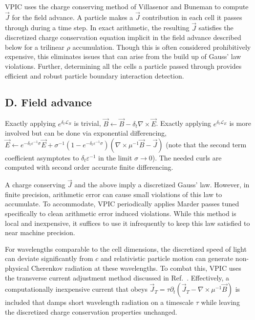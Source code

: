 \documentclass[aps,prl,preprint,preprintnumbers,groupedaddress]{revtex4}
\newcommand{\eps}{\varepsilon}
\newcommand{\vecJ}{\vec{J}}
\newcommand{\vecE}{\vec{E}}
\newcommand{\vecB}{\vec{B}}
\newcommand{\op}{\mathcal{L}}
\newcommand{\PDeriv}[2]{\partial_{#2}#1}
\newcommand{\Curl}[1]{\nabla \times #1}
\begin{document}
VPIC uses the charge conserving method of Villasenor and Buneman
\cite{Villasenor_Buneman_1992} to compute $\vecJ$ for the
field advance.  A particle makes a $\vecJ$ contribution in each cell
it passes through during a time step.  In exact arithmetic, the
resulting $\vecJ$ satisfies the discretized charge conservation
equation implicit in the field advance described below for a trilinear
$\rho$ accumulation.  Though this is often considered prohibitively
expensive, this eliminates issues that can arise from the build up of
Gauss' law violations.  Further, determining all the cells a particle
passed through provides efficient and robust particle boundary
interaction detection.

\subsection{D. Field advance}

Exactly applying $e^{\delta_t \op_B}$ is trivial, $\vecB \leftarrow
\vecB - \delta_t \Curl{\vecE}$.  Exactly applying
$e^{\delta_t \op_E}$ is more involved but can be done via
exponential differencing, $\vecE \leftarrow e^{-\delta_t \eps^{-1}
\sigma} \vecE +
\sigma^{-1}\left( 1 - e^{-\delta_t \eps^{-1} \sigma} \right)
\left( \Curl{\mu^{-1}\vecB} - \vecJ \right)$ (note that the second
term coefficient asymptotes to $\delta_t \eps^{-1}$ in the limit
$\sigma \rightarrow 0$).  The needed curls are computed with second
order accurate finite differencing.

A charge conserving $\vecJ$ and the above imply a discretized Gauss'
law.  However, in finite precision, arithmetic error can cause small
violations of this law to accumulate.  To accommodate, VPIC
periodically applies Marder passes \cite{Marder_1987} tuned
specifically to clean arithmetic error induced violations.  While this
method is local and inexpensive, it suffices to use it infrequently to
keep this law satisfied to near machine precision.

For wavelengths comparable to the cell dimensions, the discretized
speed of light can deviate significantly from $c$ and relativistic
particle motion can generate non-physical Cherenkov radiation at these
wavelengths.  To combat this, VPIC uses the transverse current
adjustment method discussed in Ref.~\cite{Eastwood_et_al_1995}.
Effectively, a computationally inexpensive current that obeys $\vecJ_T
= \tau \PDeriv{\left(\vecJ_T - \Curl{\mu^{-1}\vecB}\right)}{t}$ is
included that damps short wavelength radiation on a timescale $\tau$
while leaving the discretized charge conservation properties unchanged.
\end{document}
